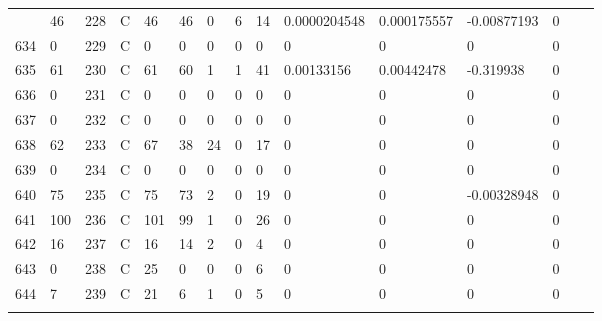 \begin{longtable}{lllllllllllllll}
\begin{comment}
	633 & 46                & 228 & C   & 46                & 46                & 0                 & 6    & 14         & 0.0000204548   & 0.000175557    & -0.00877193   & 0            \\
	634 & 0                 & 229 & C   & 0                 & 0                 & 0                 & 0    & 0          & 0              & 0              & 0             & 0            \\
	635 & 61                & 230 & C   & 61                & 60                & 1                 & 1    & 41         & 0.00133156     & 0.00442478     & -0.319938     & 0            \\
	636 & 0                 & 231 & C   & 0                 & 0                 & 0                 & 0    & 0          & 0              & 0              & 0             & 0            \\
	637 & 0                 & 232 & C   & 0                 & 0                 & 0                 & 0    & 0          & 0              & 0              & 0             & 0            \\
	638 & 62                & 233 & C   & 67                & 38                & 24                & 0    & 17         & 0              & 0              & 0             & 0            \\
	639 & 0                 & 234 & C   & 0                 & 0                 & 0                 & 0    & 0          & 0              & 0              & 0             & 0            \\
	640 & 75                & 235 & C   & 75                & 73                & 2                 & 0    & 19         & 0              & 0              & -0.00328948   & 0            \\
	641 & 100               & 236 & C   & 101               & 99                & 1                 & 0    & 26         & 0              & 0              & 0             & 0            \\
	642 & 16                & 237 & C   & 16                & 14                & 2                 & 0    & 4          & 0              & 0              & 0             & 0            \\
	643 & 0                 & 238 & C   & 25                & 0                 & 0                 & 0    & 6          & 0              & 0              & 0             & 0            \\
	644 & 7                 & 239 & C   & 21                & 6                 & 1                 & 0    & 5          & 0              & 0              & 0             & 0            \\

\end{comment}
\end{longtable}
